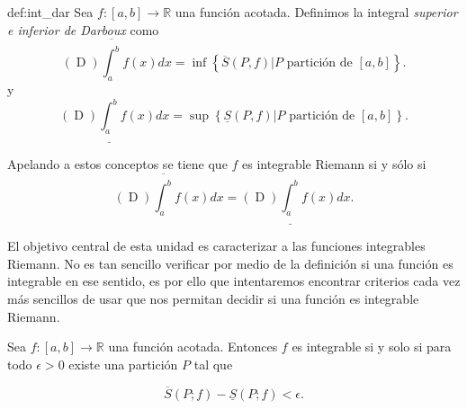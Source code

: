 \begin{definicion}{def:int_dar}
 Sea $f:[a,b]\to\mathbb{R}$ una función acotada. Definimos la integral \emph{superior e inferior de Darboux}  como
\begin{equation}\label{eq:darboux_sup}
 (\mathop{D})\overline{\int_a^b}f(x)dx=\inf\left\{\overline{S}(P,f)| P \text{ partición de }[a,b]\right\}.
 \end{equation}
y
\begin{equation}\label{eq:darboux_inf}
 (\mathop{D})\underline{\int_a^b}f(x)dx=\sup\left\{\underline{S}(P,f)| P \text{ partición de }[a,b]\right\}.
 \end{equation}
\end{definicion}

Apelando a estos conceptos se tiene que $f$ es integrable Riemann si y sólo si 
\begin{equation}\label{eq:darboux_riemann}
 (\mathop{D})\overline{\int_a^b}f(x)dx= (\mathop{D})\underline{\int_a^b}f(x)dx .
 \end{equation}
 
 
El objetivo  central de esta unidad es caracterizar a las funciones integrables Riemann. No es tan sencillo verificar por medio de la definición si una función es integrable en ese sentido, es por ello que intentaremos encontrar criterios cada vez más sencillos de usar que nos permitan decidir si una función es integrable Riemann.

\begin{teorema}{}  Sea $f:[a,b]\to\mathbb{R}$ una función acotada. Entonces  $f$ es integrable si y solo si para todo $\epsilon>0$ existe una partición $P$ tal que 

\begin{equation}\label{eq:Crit0Int}
 \overline{S}(P;f)-\underline{S}(P;f)<\epsilon.
\end{equation}
 
\end{teorema}

